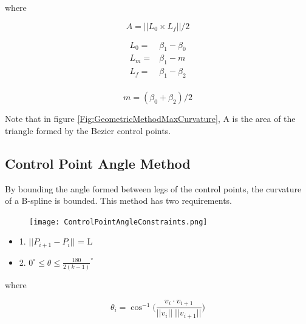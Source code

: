 \documentclass{article}
\begin{document}
where

\begin{equation}
    A = ||L_0 \times L_f||/2
\end{equation}

\begin{equation}
\begin{aligned}
    L_0 =& \beta_1 - \beta_0 \\
    L_m =& \beta_1 - m \\
    L_f =& \beta_1 - \beta_2 \\
\end{aligned}
\end{equation}

\begin{equation}
    m = (\beta_0+\beta_2)/2
\end{equation}

Note that in figure \ref{Fig:GeometricMethodMaxCurvature}, A is the area of the triangle formed by the Bezier control points.

\subsection{Control Point Angle Method}

By bounding the angle formed between legs of the control points, the curvature of a B-spline is bounded. This method has two requirements.

\begin{figure}[H]
\begin{center}
\texttt{[image: ControlPointAngleConstraints.png]}
\end{center}
\caption{}
\label{Fig:ControlPointAngleConstraints}
\end{figure}

    
\begin{itemize}
  \item[] 1. \(||P_{i+1} - P_i||\) = L 
  \item[] 2. \( 0^{\circ} \leq \theta \leq \frac{180}{2(k-1)}^{\circ}\)
\end{itemize}

where 

\begin{equation}
    \theta_i = \cos^{-1}\Big(\frac{v_i \cdot v_{i+1}}{||v_i||\;||v_{i+1}||} \Big)
\end{equation}
\end{document}
